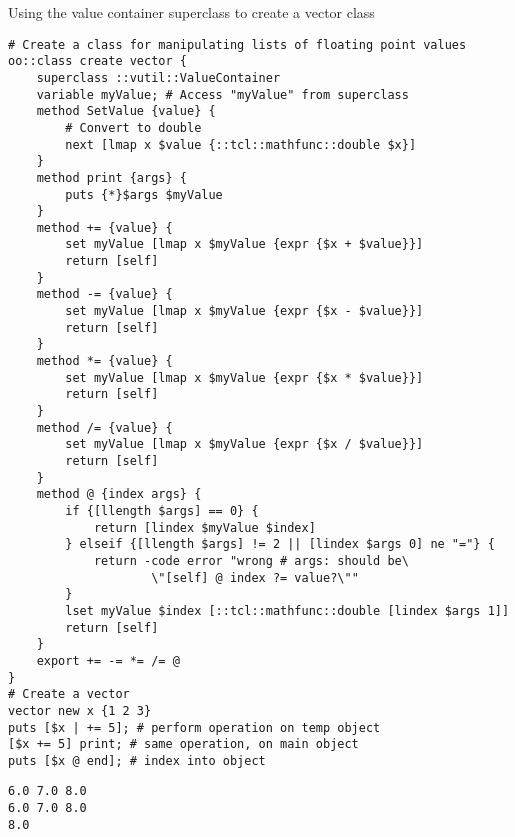 \documentclass{article}
\begin{document}
\clearpage
\begin{example}{Using the value container superclass to create a vector class}
\begin{lstlisting}
# Create a class for manipulating lists of floating point values
oo::class create vector {
    superclass ::vutil::ValueContainer
    variable myValue; # Access "myValue" from superclass
    method SetValue {value} {
        # Convert to double
        next [lmap x $value {::tcl::mathfunc::double $x}]
    }
    method print {args} {
        puts {*}$args $myValue
    }
    method += {value} {
        set myValue [lmap x $myValue {expr {$x + $value}}]
        return [self]
    }
    method -= {value} {
        set myValue [lmap x $myValue {expr {$x - $value}}]
        return [self]
    }
    method *= {value} {
        set myValue [lmap x $myValue {expr {$x * $value}}]
        return [self]
    }
    method /= {value} {
        set myValue [lmap x $myValue {expr {$x / $value}}]
        return [self]
    }
    method @ {index args} {
        if {[llength $args] == 0} {
            return [lindex $myValue $index]
        } elseif {[llength $args] != 2 || [lindex $args 0] ne "="} {
            return -code error "wrong # args: should be\
                    \"[self] @ index ?= value?\""
        }
        lset myValue $index [::tcl::mathfunc::double [lindex $args 1]]
        return [self]
    }
    export += -= *= /= @
}
# Create a vector
vector new x {1 2 3}
puts [$x | += 5]; # perform operation on temp object
[$x += 5] print; # same operation, on main object
puts [$x @ end]; # index into object
\end{lstlisting}
\tcblower
\begin{lstlisting}
6.0 7.0 8.0
6.0 7.0 8.0
8.0
\end{lstlisting}
\end{example}

\printindex
\end{document}
